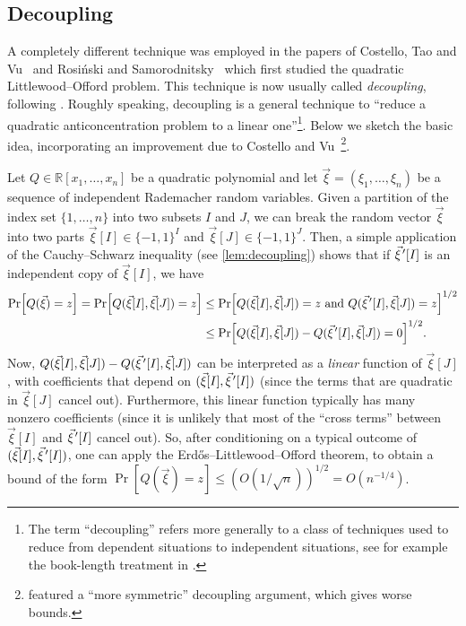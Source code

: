 \documentclass[english]{article}
\theoremstyle{remark}
\numberwithin{equation}{section}
\numberwithin{figure}{section}
\newcommand{\pvec}[1]{\vec{#1}\mkern2mu\vphantom{#1}'}
\newcommand{\RR}{\mathbb{R}}
\begin{document}
\subsection{Decoupling}\label{subsec:decoupling}

A completely different technique was employed in the papers of Costello, Tao and Vu~\cite{CTV06} and
Rosi\'nski and Samorodnitsky~\cite{RS96} which first studied the quadratic Littlewood--Offord problem. This technique is now usually called \emph{decoupling}, following \cite{CTV06}. Roughly speaking, decoupling is a general technique to ``reduce a quadratic anticoncentration problem to a linear one''\footnote{The term ``decoupling'' refers more generally to a class of techniques used to reduce from dependent situations to independent situations, see for example the book-length treatment in \cite{dlPG12}.}. Below we sketch the basic idea, incorporating an improvement due to Costello and Vu~\cite{CV08}\footnote{\cite{CTV06,RS96} featured a ``more symmetric'' decoupling argument, which gives worse bounds.}.

Let $Q\in \RR[x_1,\dots,x_n]$ be a quadratic polynomial and let $\vec{\xi}=(\xi_{1},\dots,\xi_{n})$ be a sequence of independent Rademacher
random variables. Given a partition of the index set $\{1,\dots,n\}$
into two subsets $I$ and $J$, we can break the random vector $\vec{\xi}$ into two parts 
$\vec{\xi}[I]\in\{-1,1\}^{I}$ and $\vec{\xi}[J]\in\{-1,1\}^{J}$.
Then, a simple application of the Cauchy--Schwarz inequality (see
\cref{lem:decoupling}) shows that if $\pvec\xi[I]$ is an independent copy of $\vec{\xi}[I]$,
we have
\begin{align}
\Pr\Bigl[Q(\vec \xi)=z\Bigr]=\Pr\Bigl[Q(\vec{\xi}[I],\vec{\xi}[J])=z\Bigr] & \le\Pr\Bigl[Q(\vec{\xi}[I],\vec{\xi}[J])=z\text{ and }Q(\pvec \xi[I],\vec{\xi}[J])=z\Bigr]^{1/2}\label{eq:decoupling-basic-step}\\
 & \le \Pr\Bigl[Q(\vec{\xi}[I],\vec{\xi}[J])-Q(\pvec \xi[I],\vec{\xi}[J])=0\Bigr]^{1/2}.\label{eq:linear-quadratic-decoupling}
\end{align}
Now, $Q(\vec{\xi}[I],\vec{\xi}[J])-Q(\pvec \xi[I],\vec{\xi}[J])$
can be interpreted as a \emph{linear} function of $\vec{\xi}[J]$,
with coefficients that depend on $(\vec{\xi}[I],\pvec \xi[I])$ (since the terms that are quadratic in $\vec \xi[J]$ cancel out). Furthermore, this linear function typically has many nonzero coefficients (since it is unlikely that most of the ``cross terms'' between $\vec \xi[I]$ and $\pvec \xi[I]$ cancel out). So, after conditioning on a typical outcome of $(\vec{\xi}[I],\pvec \xi[I])$, one can apply the Erd\H os--Littlewood--Offord theorem, to obtain
a bound of the form
$\Pr[Q(\vec \xi)=z]\le (O(1/\sqrt n))^{1/2}=O(n^{-1/4})$.
\end{document}
